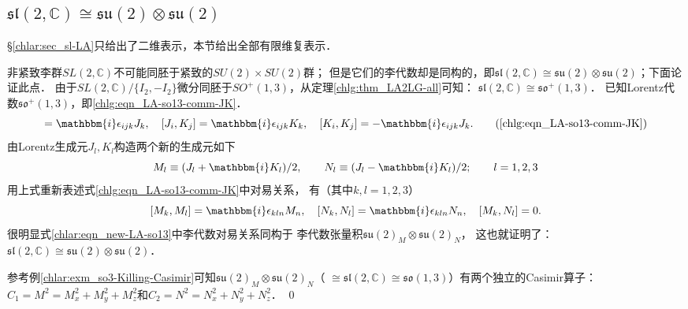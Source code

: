 \subsection{$\mathfrak{sl}(2,\mathbb{C}) \cong \mathfrak{su}(2)\otimes\mathfrak{su}(2)$}\label{chlar:sec_sl-LA2}

\S\ref{chlar:sec_sl-LA}只给出了二维表示，本节给出全部有限维复表示．

{\kaishu 非紧致}李群$SL(2,\mathbb{C})$不可能同胚于{\kaishu 紧致}的$SU(2)\times SU(2)$群；
但是它们的李代数却是同构的，即$\mathfrak{sl}(2,\mathbb{C}) \cong \mathfrak{su}(2)\otimes\mathfrak{su}(2)$；下面论证此点．
由于$SL(2,\mathbb{C})/\{I_2,-I_2\}$微分同胚于$SO^{+}(1,3)$，从定理\ref{chlg:thm_LA2LG-all}可知：
$\mathfrak{sl}(2,\mathbb{C})\cong \mathfrak{so}^{+}(1,3)$．
已知Lorentz代数$\mathfrak{so}^{+}(1,3)$，即\eqref{chlg:eqn_LA-so13-comm-JK}．
\begin{equation}
    [J_i, J_j] = \mathbbm{i} \epsilon_{ijk} J_k,\quad
    [J_i, K_j] = \mathbbm{i} \epsilon_{ijk} K_k,\quad
    [K_i, K_j] = -\mathbbm{i}\epsilon_{ijk} J_k.
    \tag{\ref{chlg:eqn_LA-so13-comm-JK}}
\end{equation}
由Lorentz生成元$J_l,K_l$构造两个新的生成元如下
\begin{equation}\label{chlar:eqn_new-so13}
    M_l \equiv (J_l + \mathbbm{i} K_l )/2, \qquad
    N_l \equiv (J_l - \mathbbm{i} K_l )/2; \qquad l=1,2,3
\end{equation}
用上式重新表述式\eqref{chlg:eqn_LA-so13-comm-JK}中对易关系，
有（其中$k,l = 1,2,3$）
\begin{equation}\label{chlar:eqn_new-LA-so13}
    [M_k, M_l] = \mathbbm{i} \epsilon_{kln} M_n, \quad
    [N_k, N_l] = \mathbbm{i} \epsilon_{kln} N_n, \quad
    [M_k, N_l] = 0.
\end{equation}
很明显式\eqref{chlar:eqn_new-LA-so13}中李代数对易关系同构于
李代数张量积$\mathfrak{su}(2)_M \otimes\mathfrak{su}(2)_N$，
这也就证明了：$\mathfrak{sl}(2,\mathbb{C}) \cong \mathfrak{su}(2)\otimes\mathfrak{su}(2)$．



\begin{example}\label{chlar:exm_sl2c-Casimir}
    参考例\ref{chlar:exm_so3-Killing-Casimir}可知$\mathfrak{su}(2)_M \otimes\mathfrak{su}(2)_N$（
    $\cong\mathfrak{sl}(2,\mathbb{C})\cong \mathfrak{so}(1,3)$）有两个独立的Casimir算子：
    ${C}_1 = M^2= M_x^2+M_y^2+M_z^2$和${C}_2 = N^2= N_x^2+N_y^2+N_z^2$． \qed
\end{example}


